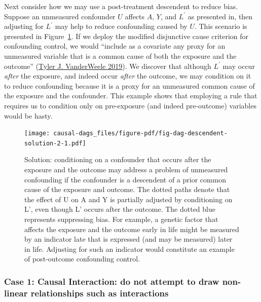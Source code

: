 \documentclass[
  singlecolumn]{article}
\begin{document}
Next consider how we may use a post-treatment descendent to reduce bias.
Suppose an unmeasured confounder \(U\) affects \(A\), \(Y\), and
\(L^\prime\) as presented in, then adjusting for \(L^\prime\) may help
to reduce confounding caused by \(U\). This scenario is presented in
Figure~\ref{fig-dag-descendent-solution-2}. If we deploy the modified
disjunctive cause criterion for confounding control, we would ``include
as a covariate any proxy for an unmeasured variable that is a common
cause of both the exposure and the outcome''
(\protect\hyperlink{ref-vanderweele2019}{Tyler J. VanderWeele 2019}). We
discover that although \(L^\prime\) may occur \emph{after} the exposure,
and indeed occur \emph{after} the outcome, we may condition on it to
reduce confounding because it is a proxy for an unmeasured common cause
of the exposure and the confounder. This example shows that employing a
rule that requires us to condition only on pre-exposure (and indeed
pre-outcome) variables would be hasty.

\begin{figure}

{\centering \texttt{[image: causal-dags\_files/figure-pdf/fig-dag-descendent-solution-2-1.pdf]}

}

\caption{\label{fig-dag-descendent-solution-2}Solution: conditioning on
a confounder that occurs after the exposure and the outcome may address
a problem of unmeasured confounding if the confounder is a descendent of
a prior common cause of the exposure and outcome. The dotted paths
denote that the effect of U on A and Y is partially adjusted by
conditioning on L', even though L' occurs after the outcome. The dotted
blue represents suppressing bias. For example, a genetic factor that
affects the exposure and the outcome early in life might be measured by
an indicator late that is expressed (and may be measured) later in life.
Adjusting for such an indicator would constitute an example of
post-outcome confounding control.}

\end{figure}

\hypertarget{case-1-causal-interaction-do-not-attempt-to-draw-non-linear-relationships-such-as-interactions}{%
\subsubsection{Case 1: Causal Interaction: do not attempt to draw
non-linear relationships such as
interactions}\label{case-1-causal-interaction-do-not-attempt-to-draw-non-linear-relationships-such-as-interactions}}
\end{document}
